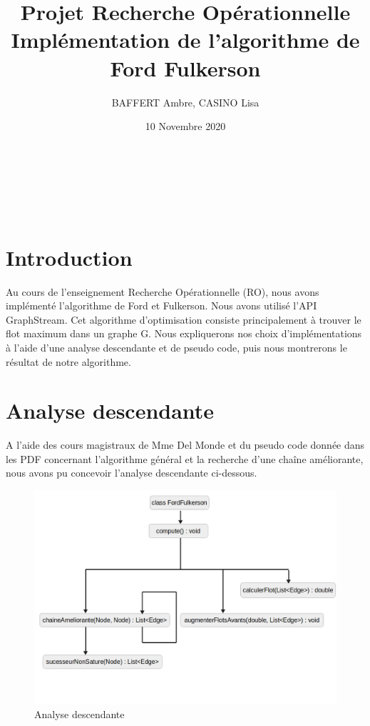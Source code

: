 \documentclass{article}
\title{\textbf{Projet Recherche Opérationnelle\\
Implémentation de l'algorithme de Ford Fulkerson}}
\author{BAFFERT Ambre, CASINO Lisa}
\date{10 Novembre 2020}
\begin{document}
\makeatletter
  \begin{titlepage}
  \centering
    \vspace{1cm}
      \hfill
    \vspace{1cm}
    \vfill
       {\LARGE \textbf{\@title}} \\
    \vspace{2em}
        {\large \@author} \\
    \vspace{3em}
        {\large \@date} \\
    \vfill
  \end{titlepage}
\makeatother

\newpage{}
\section{Introduction}

Au cours de l'enseignement Recherche Opérationnelle (RO), nous avons implémenté l'algorithme de Ford et Fulkerson. Nous avons utilisé l'API  GraphStream. Cet algorithme d'optimisation consiste principalement à trouver le flot maximum dans un graphe G. Nous expliquerons nos choix d'implémentations à l'aide d'une analyse descendante et de pseudo code, puis nous montrerons le résultat de notre algorithme.

\section{Analyse descendante}

A l'aide des cours magistraux de Mme Del Monde et du pseudo code donnée dans les PDF concernant l'algorithme général et la recherche d'une chaîne améliorante, nous avons pu concevoir l'analyse descendante ci-dessous.

\begin{figure}[!ht]
    \center
    \includegraphics[width=13cm]{./images/AnalyseDescendante.png}
    \caption{Analyse descendante}
\end{figure}
\end{document}
